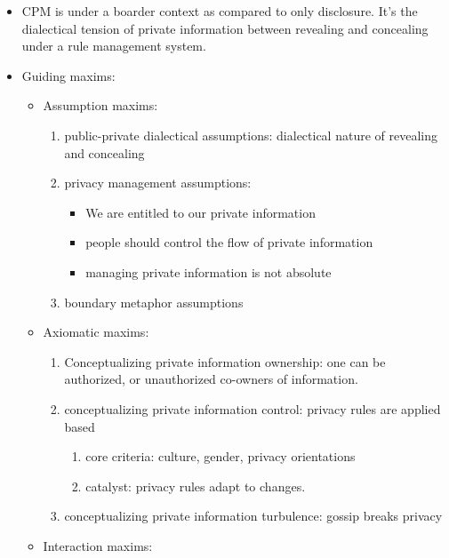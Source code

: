 \documentclass[
]{book}
\providecommand{\tightlist}{%
  \setlength{\itemsep}{0pt}\setlength{\parskip}{0pt}}
\begin{document}
\begin{itemize}
\item
  CPM is under a boarder context as compared to only disclosure. It's the dialectical tension of private information between revealing and concealing under a rule management system.
\item
  Guiding maxims:

  \begin{itemize}
  \item
    Assumption maxims:

    \begin{enumerate}
    \def\labelenumi{(\arabic{enumi})}
    \item
      public-private dialectical assumptions: dialectical nature of revealing and concealing
    \item
      privacy management assumptions:

      \begin{itemize}
      \tightlist
      \item
        We are entitled to our private information
      \item
        people should control the flow of private information
      \item
        managing private information is not absolute
      \end{itemize}
    \item
      boundary metaphor assumptions
    \end{enumerate}
  \item
    Axiomatic maxims:

    \begin{enumerate}
    \def\labelenumi{(\arabic{enumi})}
    \item
      Conceptualizing private information ownership: one can be authorized, or unauthorized co-owners of information.
    \item
      conceptualizing private information control: privacy rules are applied based

      \begin{enumerate}
      \def\labelenumii{(\arabic{enumii})}
      \tightlist
      \item
        core criteria: culture, gender, privacy orientations
      \item
        catalyst: privacy rules adapt to changes.
      \end{enumerate}
    \item
      conceptualizing private information turbulence: gossip breaks privacy
    \end{enumerate}
  \item
    Interaction maxims:


\end{itemize}
\end{itemize}
\end{document}
